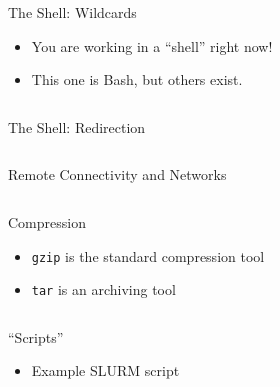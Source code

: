 \documentclass[hyperref={pdfpagelabels=false},12pt]{beamer}
\begin{document}
\begin{frame}{The Shell: Wildcards}
\begin{itemize}
    \item You are working in a ``shell'' right now!
    \item This one is Bash, but others exist.
\end{itemize}
\inputminted[bgcolor=lightgray,linenos,fontsize=\footnotesize]{bash}{code/shell-1.txt}
\end{frame}

\begin{frame}{The Shell: Redirection}
\inputminted[bgcolor=lightgray,linenos,fontsize=\footnotesize]{bash}{code/shell-2.txt}
\end{frame}

\begin{frame}{Remote Connectivity and Networks}
\inputminted[bgcolor=lightgray,linenos,fontsize=\footnotesize]{bash}{code/ssh-config-1.txt}
\end{frame}

\begin{frame}{Compression}
\begin{itemize}
    \item \texttt{gzip} is the standard compression tool
    \item \texttt{tar} is an archiving tool
\end{itemize}
\inputminted[bgcolor=lightgray,linenos,fontsize=\footnotesize]{bash}{code/compression-1.txt}
\end{frame}

\begin{frame}{``Scripts''}
    \begin{itemize}
        \item Example SLURM script
    \end{itemize}
\inputminted[bgcolor=lightgray,linenos,fontsize=\footnotesize]{bash}{code/benzene.slurm}
\end{frame}
\end{document}
